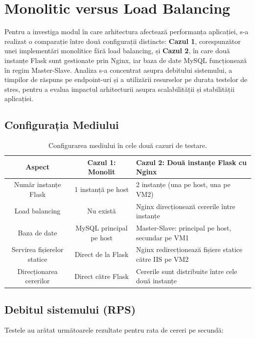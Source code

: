 \documentclass[12pt, a4paper, oneside, romanian]{teza-upb}
\begin{document}
\section{Monolitic versus Load Balancing}

Pentru a investiga modul în care arhitectura afectează performanța aplicației, s-a realizat o comparație între două configurații distincte: \textbf{Cazul 1}, corespunzător unei implementări monolitice fără load balancing, și \textbf{Cazul 2}, în care două instanțe Flask sunt gestionate prin Nginx, iar baza de date MySQL funcționează în regim Master-Slave. Analiza s-a concentrat asupra debitului sistemului, a timpilor de răspuns pe endpoint-uri și a utilizării resurselor pe durata testelor de stres, pentru a evalua impactul arhitecturii asupra scalabilității și stabilității aplicației.

\subsection*{Configurația Mediului}

\begin{table}[h!]
\centering
\begin{tabular}{c|c|p{8cm}}
\hline
Aspect & Cazul 1: Monolit & Cazul 2: Două instanțe Flask cu Nginx \\
\hline
Număr instanțe Flask & 1 instanță pe host & 2 instanțe (una pe host, una pe VM2) \\
Load balancing & Nu există & Nginx direcționează cererile între instanțe \\
Baza de date & MySQL principal pe host & Master-Slave: principal pe host, secundar pe VM1 \\
Servirea fișierelor statice & Direct de la Flask & Nginx redirecționează fișiere statice către IIS pe VM2 \\
Direcționarea cererilor & Direct către Flask & Cererile sunt distribuite între cele două instanțe \\
\hline
\end{tabular}
\caption{Configurarea mediului în cele două cazuri de testare.}
\label{tab:config}
\end{table}

\subsection*{Debitul sistemului (RPS)}

Testele au arătat următoarele rezultate pentru rata de cereri pe secundă:
\end{document}
